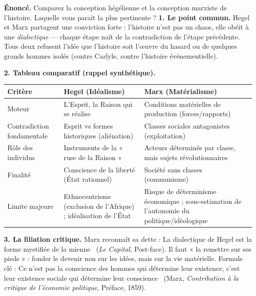 \documentclass[11pt]{article}
\begin{document}
\begin{exoresolu}
\textbf{Énoncé.} Comparez la conception hégélienne et la conception marxiste de l'histoire. Laquelle vous paraît la plus pertinente ?
\tcblower
\textbf{1. Le point commun.} Hegel et Marx partagent une conviction forte : l'histoire n'est pas un chaos, elle obéit à une \emph{dialectique} — chaque étape naît de la contradiction de l'étape précédente. Tous deux refusent l'idée que l'histoire soit l'œuvre du hasard ou de quelques grands hommes isolés (contre Carlyle, contre l'histoire événementielle).

\textbf{2. Tableau comparatif (rappel synthétique).}
\begin{center}
\begin{tabularx}{\linewidth}{|l|X|X|}
\hline
\rowcolor{popblueL} \textbf{Critère} & \textbf{Hegel (Idéalisme)} & \textbf{Marx (Matérialisme)} \\
\hline
Moteur & L'Esprit, la Raison qui se réalise & Conditions matérielles de production (forces/rapports) \\
\hline
Contradiction fondamentale & Esprit vs formes historiques (aliénation) & Classes sociales antagonistes (exploitation) \\
\hline
Rôle des individus & Instruments de la « ruse de la Raison » & Acteurs déterminés par classe, mais sujets révolutionnaires \\
\hline
Finalité & Conscience de la liberté (État rationnel) & Société sans classes (communisme) \\
\hline
Limite majeure & Ethnocentrisme (exclusion de l'Afrique) ; idéalisation de l'État & Risque de déterminisme économique ; sous-estimation de l'autonomie du politique/idéologique \\
\hline
\end{tabularx}
\end{center}

\textbf{3. La filiation critique.} Marx reconnaît sa dette : \guillemotleft La dialectique de Hegel est la forme mystifiée de la mienne \guillemotright\ (\emph{Le Capital}, Post-face). Il faut « la remettre sur ses pieds » : fonder le devenir non sur les idées, mais sur la vie matérielle. Formule clé : \guillemotleft Ce n'est pas la conscience des hommes qui détermine leur existence, c'est leur existence sociale qui détermine leur conscience \guillemotright\ (Marx, \emph{Contribution à la critique de l'économie politique}, Préface, 1859).


\end{exoresolu}
\end{document}
